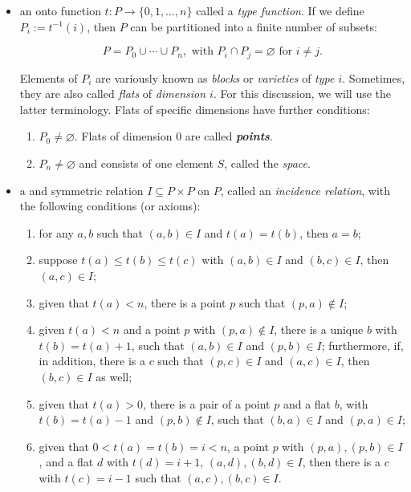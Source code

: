 \documentclass[12pt]{article}
\begin{document}
\begin{itemize}
\item an onto function $t\colon P\to\lbrace0,1,\ldots,n\rbrace$ called a \emph{type function}.  If we define $P_i:=t^{-1}(i)$, then $P$ can be partitioned into a finite number of subsets:

$$P=P_0\cup\cdots\cup P_n,\mbox{ with }P_i\cap P_j=\varnothing\mbox{ for }i\neq j.$$

Elements of $P_i$ are variously known as \emph{blocks} or \emph{varieties} of \emph{type $i$}.  Sometimes, they are also called \emph{flats} of \emph{dimension $i$}.  For this discussion, we will use the latter terminology.  Flats of specific dimensions have further conditions:

\begin{enumerate}
\item $P_0\neq\varnothing$.  Flats of dimension 0 are called \textbf{\emph{points}}.
\item $P_n\neq\varnothing$ and consists of one element $S$, called the
\emph{space}.
\end{enumerate}

\item a  and symmetric relation $I\subseteq P\times P$ on $P$, called an \emph{incidence relation}, with the following conditions (or axioms):

\begin{enumerate}
\item for any $a,b$ such that $(a,b)\in I$ and $t(a)=t(b)$, then $a=b$;
\item suppose $t(a)\leq t(b)\leq t(c)$ with $(a,b)\in I$ and $(b,c)\in I$, then $(a,c)\in I$;
\item given that $t(a)<n$, there is a point $p$ such that $(p,a)\notin I$;
\item given $t(a)<n$ and a point $p$ with $(p,a)\notin I$, there is a unique $b$ with $t(b)=t(a)+1$, such that $(a,b)\in I$ and $(p,b)\in I$; furthermore, if, in addition, there is a $c$ such that $(p,c)\in I$ and $(a,c)\in I$, then $(b,c)\in I$ as well;
\item given that $t(a)>0$, there is a pair of a point $p$ and a flat $b$, with $t(b)=t(a)-1$ and $(p,b)\notin I$, such that $(b,a)\in I$ and $(p,a)\in I$;
\item given that $0<t(a)=t(b)=i<n$, a point $p$ with $(p,a),(p,b)\in I$, and a flat $d$ with $t(d)=i+1$, $(a,d),(b,d)\in I$, then there is a $c$ with $t(c)=i-1$ such that $(a,c),(b,c)\in I$.
\end{enumerate}
\end{itemize}
\end{document}
